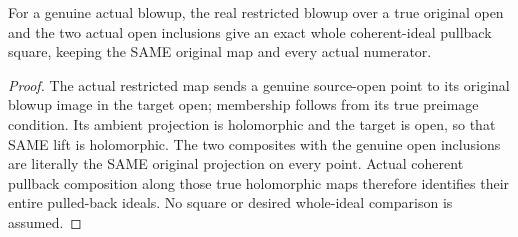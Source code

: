 \begin{lemma}
\label{hir:original-coherent-history-actual-restricted-blowup-ideal-square}
\leanok
{}
For a genuine actual blowup, the real restricted blowup over a true original
open and the two actual open inclusions give an exact whole coherent-ideal
pullback square, keeping the SAME original map and every actual numerator.
\end{lemma}
\begin{proof}
The actual restricted map sends a genuine source-open point to its original
blowup image in the target open; membership follows from its true preimage
condition. Its ambient projection is holomorphic and the target is open, so
that SAME lift is holomorphic. The two composites with the genuine open
inclusions are literally the SAME original projection on every point.
Actual coherent pullback composition along those true holomorphic maps
therefore identifies their entire pulled-back ideals. No square or desired
whole-ideal comparison is assumed.
\end{proof}

